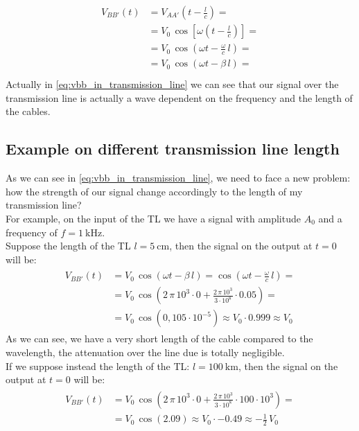 \begin{align}\label{eq:vbb_in_transmission_line}
  \begin{split}
    V_{BB'}(t)&=V_{AA'}\left(t-\frac{l}{c}\right)=\\[5pt]
      &=V_0 \, \cos\left[\omega \left(t-\frac{l}{c}\right)\right]=\\[5pt]
      &=V_0\, \cos\left(\omega t-\frac{\omega}{c}\, l\right)=\\[5pt]
      &=V_0\, \cos\left(\omega t-\beta\, l\right)= \\[5pt]
  \end{split}
\end{align}
Actually in \cref{eq:vbb_in_transmission_line} we can see that our signal over the transmission line is actually a wave dependent on the frequency and the length of the cables.
\subsection*{Example on different transmission line length}
As we can see in \cref{eq:vbb_in_transmission_line}, we need to face a new problem: how the strength of our signal change accordingly to the length of my transmission line?\\
For example, on the input of the TL we have a signal with amplitude $A_0$ and a frequency of $f=\SI{1}{\kilo\hertz}$.\\
Suppose the length of the TL $l=\SI{5}{\centi \meter}$, then the signal on the output at $t=0$ will be:
\begin{align*}
  \begin{split}
  V_{BB'}(t)&=V_0\, \cos\left(\omega t-\beta\, l\right)=\cos\left(\omega t-\frac{\omega}{c}\, l\right)=\\[5pt]
  &=V_0\, \cos\left(2\,\pi\,10^{3}\cdot 0+\frac{2\,\pi\,10^{3}}{3\cdot 10^{8}}\cdot 0.05\right)=\\[5pt]
  &=V_0\,\cos(0,105 \cdot 10^{-5})\approx V_0\cdot 0.999\approx V_0
  \end{split}
\end{align*}
As we can see, we have a very short length of the cable compared to the wavelength, the attenuation over the line due is totally negligible.\\
If we suppose instead the length of the TL: $l=\SI{100}{\kilo \meter}$, then the signal on the output at $t=0$ will be:
\begin{align*}
  \begin{split}
  V_{BB'}(t)&=V_0\, \cos\left(2\,\pi\,10^{3}\cdot 0+\frac{2\,\pi\,10^{3}}{3\cdot 10^{8}}\cdot100\cdot 10^{3}\right)=\\[5pt]
  &=V_0\,\cos(2.09)\approx V_0\cdot -0.49\approx -\frac{1}{2}\,V_0
  \end{split}
\end{align*}
